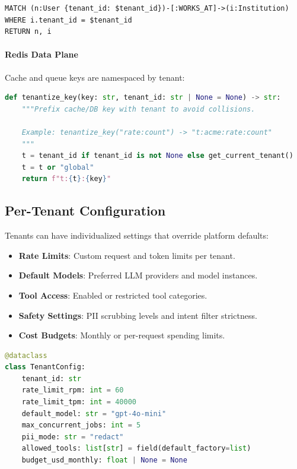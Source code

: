 \begin{lstlisting}[language=cypher,caption={Tenant-scoped Cypher query}]
MATCH (n:User {tenant_id: $tenant_id})-[:WORKS_AT]->(i:Institution)
WHERE i.tenant_id = $tenant_id
RETURN n, i
\end{lstlisting}

\paragraph{Redis Data Plane}
Cache and queue keys are namespaced by tenant:

\begin{lstlisting}[language=Python,caption={Tenant-scoped key namespacing}]
def tenantize_key(key: str, tenant_id: str | None = None) -> str:
    """Prefix cache/DB key with tenant to avoid collisions.
    
    Example: tenantize_key("rate:count") -> "t:acme:rate:count"
    """
    t = tenant_id if tenant_id is not None else get_current_tenant()
    t = t or "global"
    return f"t:{t}:{key}"
\end{lstlisting}

\subsection{Per-Tenant Configuration}
\label{subsec:per-tenant-config}

Tenants can have individualized settings that override platform defaults:

\begin{itemize}
    \item \textbf{Rate Limits}: Custom request and token limits per tenant.
    \item \textbf{Default Models}: Preferred LLM providers and model instances.
    \item \textbf{Tool Access}: Enabled or restricted tool categories.
    \item \textbf{Safety Settings}: PII scrubbing levels and intent filter strictness.
    \item \textbf{Cost Budgets}: Monthly or per-request spending limits.
\end{itemize}

\begin{lstlisting}[language=Python,caption={Per-tenant configuration example}]
@dataclass
class TenantConfig:
    tenant_id: str
    rate_limit_rpm: int = 60
    rate_limit_tpm: int = 40000
    default_model: str = "gpt-4o-mini"
    max_concurrent_jobs: int = 5
    pii_mode: str = "redact"
    allowed_tools: list[str] = field(default_factory=list)
    budget_usd_monthly: float | None = None
\end{lstlisting}


